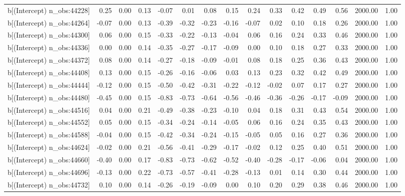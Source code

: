 \begin{table}[ht]
\begin{tabular}{rrrrrrrrrrrrrrr}
  b[(Intercept) n\_obs:44228] & 0.25 & 0.00 & 0.13 & -0.07 & 0.01 & 0.08 & 0.15 & 0.24 & 0.33 & 0.42 & 0.49 & 0.56 & 2000.00 & 1.00 \\ 
  b[(Intercept) n\_obs:44264] & -0.07 & 0.00 & 0.13 & -0.39 & -0.32 & -0.23 & -0.16 & -0.07 & 0.02 & 0.10 & 0.18 & 0.26 & 2000.00 & 1.00 \\ 
  b[(Intercept) n\_obs:44300] & 0.06 & 0.00 & 0.15 & -0.33 & -0.22 & -0.13 & -0.04 & 0.06 & 0.16 & 0.24 & 0.33 & 0.46 & 2000.00 & 1.00 \\ 
  b[(Intercept) n\_obs:44336] & 0.00 & 0.00 & 0.14 & -0.35 & -0.27 & -0.17 & -0.09 & 0.00 & 0.10 & 0.18 & 0.27 & 0.33 & 2000.00 & 1.00 \\ 
  b[(Intercept) n\_obs:44372] & 0.08 & 0.00 & 0.14 & -0.27 & -0.18 & -0.09 & -0.01 & 0.08 & 0.18 & 0.25 & 0.36 & 0.43 & 2000.00 & 1.00 \\ 
  b[(Intercept) n\_obs:44408] & 0.13 & 0.00 & 0.15 & -0.26 & -0.16 & -0.06 & 0.03 & 0.13 & 0.23 & 0.32 & 0.42 & 0.49 & 2000.00 & 1.00 \\ 
  b[(Intercept) n\_obs:44444] & -0.12 & 0.00 & 0.15 & -0.50 & -0.42 & -0.31 & -0.22 & -0.12 & -0.02 & 0.07 & 0.17 & 0.27 & 2000.00 & 1.00 \\ 
  b[(Intercept) n\_obs:44480] & -0.45 & 0.00 & 0.15 & -0.83 & -0.73 & -0.64 & -0.56 & -0.46 & -0.36 & -0.26 & -0.17 & -0.09 & 2000.00 & 1.00 \\ 
  b[(Intercept) n\_obs:44516] & 0.04 & 0.00 & 0.21 & -0.49 & -0.38 & -0.23 & -0.10 & 0.04 & 0.18 & 0.31 & 0.43 & 0.54 & 2000.00 & 1.00 \\ 
  b[(Intercept) n\_obs:44552] & 0.05 & 0.00 & 0.15 & -0.34 & -0.24 & -0.14 & -0.05 & 0.06 & 0.16 & 0.24 & 0.35 & 0.43 & 2000.00 & 1.00 \\ 
  b[(Intercept) n\_obs:44588] & -0.04 & 0.00 & 0.15 & -0.42 & -0.34 & -0.24 & -0.15 & -0.05 & 0.05 & 0.16 & 0.27 & 0.36 & 2000.00 & 1.00 \\ 
  b[(Intercept) n\_obs:44624] & -0.02 & 0.00 & 0.21 & -0.56 & -0.41 & -0.29 & -0.17 & -0.02 & 0.12 & 0.25 & 0.40 & 0.51 & 2000.00 & 1.00 \\ 
  b[(Intercept) n\_obs:44660] & -0.40 & 0.00 & 0.17 & -0.83 & -0.73 & -0.62 & -0.52 & -0.40 & -0.28 & -0.17 & -0.06 & 0.04 & 2000.00 & 1.00 \\ 
  b[(Intercept) n\_obs:44696] & -0.13 & 0.00 & 0.22 & -0.73 & -0.57 & -0.41 & -0.28 & -0.13 & 0.01 & 0.14 & 0.30 & 0.44 & 2000.00 & 1.00 \\ 
  b[(Intercept) n\_obs:44732] & 0.10 & 0.00 & 0.14 & -0.26 & -0.19 & -0.09 & 0.00 & 0.10 & 0.20 & 0.29 & 0.38 & 0.46 & 2000.00 & 1.00 \\ 

\end{tabular}
\end{table}
